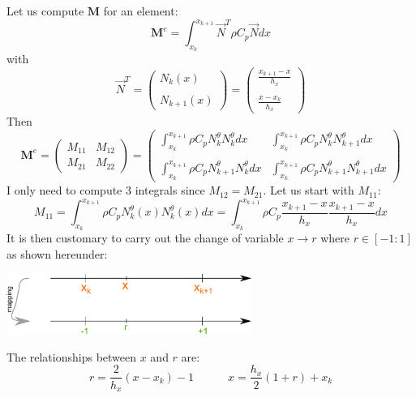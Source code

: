 Let us compute ${\bm M}$ for an element:
\[
{\bm M}^e=  \int_{x_k}^{x_{k+1}}   {\vec N}^T \rho C_p {\vec N} dx  
\]
with 
\[
{\vec N}^T = 
\left(
\begin{array}{c}
N_k(x)  \\ \\  N_{k+1}(x)
\end{array}
\right)
=
\left(
\begin{array}{c}
\frac{x_{k+1}-x}{h_x}   \\ \\
\frac{x-x_k}{h_x} 
\end{array}
\right)
\]
Then 
\[
{\bm M}^e
=
\left(
\begin{array}{cc}
M_{11} & M_{12} \\
M_{21} & M_{22} 
\end{array}
\right)
=
\left(
\begin{array}{cc}
\int_{x_k}^{x_{k+1}} \rho C_p N_k^\theta N_{k}^\theta dx   &  \int_{x_k}^{x_{k+1}} \rho C_p N_k^\theta N_{k+1}^\theta dx \\ \\
\int_{x_k}^{x_{k+1}} \rho C_p N_{k+1}^\theta N_{k}^\theta dx  &  \int_{x_k}^{x_{k+1}} \rho C_p N_{k+1}^\theta N_{k+1}^\theta dx 
\end{array}
\right)
\]
I only need to compute 3 integrals since $M_{12}=M_{21}$.
Let us start with $M_{11}$:
\[
M_{11}=\int_{x_k}^{x_{k+1}} \rho C_p N_k^\theta(x) N_{k}^\theta(x) dx
=   
\int_{x_k}^{x_{k+1}} \rho C_p 
\frac{x_{k+1}-x}{h_x}  
\frac{x_{k+1}-x}{h_x}  
dx
\]
It is then customary to carry out the change of variable $x \rightarrow r$ where 
$r \in [-1:1]$ as shown hereunder:
\begin{center}
\includegraphics[width=8cm]{images/oneD/el1D_mapping}
\end{center}
The relationships between $x$ and $r$ are:
\[
r=\frac{2}{h_x}(x-x_k)-1
\quad\quad\quad
x=\frac{h_x}{2}(1+r)+x_k
\]

